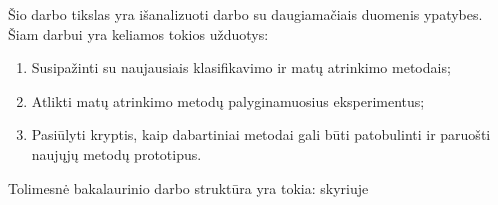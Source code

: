 Šio darbo tikslas yra išanalizuoti darbo su daugiamačiais duomenis ypatybes. Šiam darbui yra keliamos tokios užduotys:
\begin{enumerate}
 \item Susipažinti su naujausiais klasifikavimo ir matų atrinkimo metodais;
 \item Atlikti matų atrinkimo metodų palyginamuosius eksperimentus;
 \item Pasiūlyti kryptis, kaip dabartiniai metodai gali būti patobulinti ir paruošti naujųjų metodų prototipus.
\end{enumerate}

Tolimesnė bakalaurinio darbo struktūra yra tokia: skyriuje

